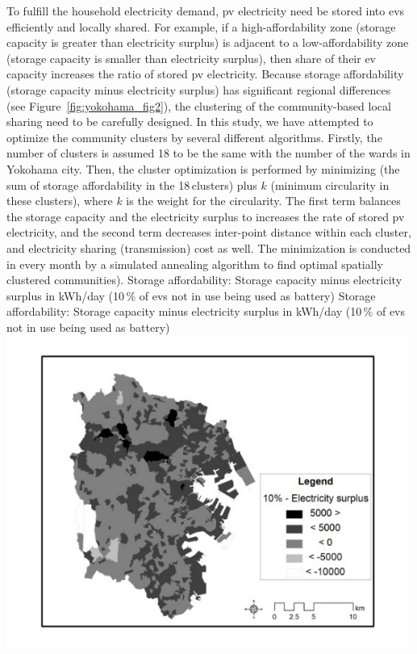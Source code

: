 To fulfill the household electricity demand, \gls{pv} electricity need be stored into \glspl{ev} efficiently and locally shared. For example, if a high-affordability zone (storage capacity is greater than electricity surplus) is adjacent to a low-affordability zone (storage capacity is smaller than electricity surplus), then share of their \gls{ev} capacity increases the ratio of stored \gls{pv} electricity. Because storage affordability (storage capacity minus electricity surplus) has significant regional differences (see Figure~\ref{fig:yokohama_fig2}), the clustering of the community-based local sharing need to be carefully designed. In this study, we have attempted to optimize the community clusters by several different algorithms. Firstly, the number of clusters is assumed 18 to be the same with the number of the wards in Yokohama city. Then, the cluster optimization is performed by minimizing (the sum of storage affordability in the 18\,clusters) plus $k$ (minimum circularity in these clusters), where $k$ is the weight for the circularity. The first term balances the storage capacity and the electricity surplus to increases the rate of stored \gls{pv} electricity, and the second term decreases inter-point distance within each cluster, and electricity sharing (transmission) cost as well. The minimization is conducted in every month by a simulated annealing algorithm to find optimal spatially clustered communities).
%
\createfigure%
{Storage affordability: Storage capacity minus electricity surplus in kWh/day (10\,\% of \glspl{ev} not in use being used as battery)}%
{Storage affordability: Storage capacity minus electricity surplus in kWh/day (10\,\% of \glspl{ev} not in use being used as battery)}%
{\label{fig:yokohama_fig2}}%
{\includegraphics[width=0.99\textwidth, angle=0]{./scenarios/figures/yokohama_fig2.png}}%

